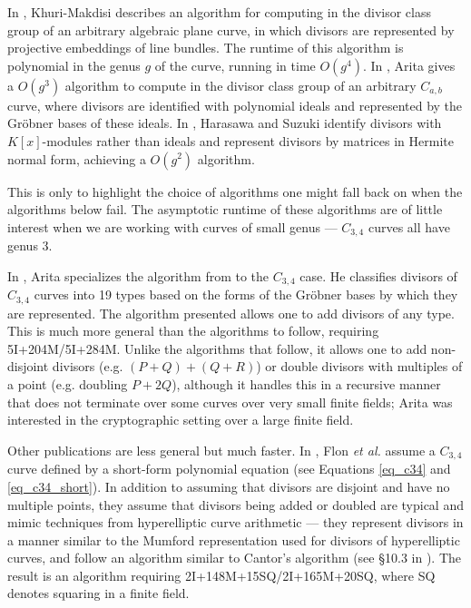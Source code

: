 In \cite{kmakdisi04}, Khuri-Makdisi describes an algorithm for computing in the divisor class group of an arbitrary algebraic plane curve,
in which divisors are represented by projective embeddings of line bundles.
The runtime of this algorithm is polynomial in the genus $g$ of the curve, running in time $O(g^4)$.
In \cite{arita99}, Arita gives a $O(g^3)$ algorithm to compute in the divisor class group of an arbitrary $C_{a,b}$ curve,
where divisors are identified with polynomial ideals and represented by the Gr\"obner bases of these ideals.
In \cite{harasawa00}, Harasawa and Suzuki identify divisors with $K[x]$-modules rather than ideals and represent divisors by matrices in Hermite normal form,
achieving a $O(g^2)$ algorithm.

This is only to highlight the choice of algorithms one might fall back on when the algorithms below fail.
The asymptotic runtime of these algorithms are of little interest when we are working with curves of small genus ---
$C_{3,4}$ curves all have genus 3.

In \cite{arita05-2}, Arita specializes the algorithm from \cite{arita99} to the $C_{3,4}$ case.
He classifies divisors of $C_{3,4}$ curves into 19 types based on the forms of the Gr\"obner bases by which they are represented.
The algorithm presented allows one to add divisors of any type.
This is much more general than the algorithms to follow, requiring 5I+204M/5I+284M.
Unlike the algorithms that follow, it allows one to add non-disjoint divisors (e.g. $(P + Q) + (Q + R)$)
or double divisors with multiples of a point (e.g. doubling $P + 2Q$),
although it handles this in a recursive manner that does not terminate over some curves over very small finite fields;
Arita was interested in the cryptographic setting over a large finite field.

Other publications are less general but much faster.
In \cite{flon08}, Flon \emph{et al.} assume a $C_{3,4}$ curve defined by a short-form polynomial equation
(see Equations \ref{eq_c34} and \ref{eq_c34_short}).
In addition to assuming that divisors are disjoint and have no multiple points, 
they assume that divisors being added or doubled are typical and mimic techniques from hyperelliptic curve arithmetic ---
they represent divisors in a manner similar to the Mumford representation used for divisors of hyperelliptic curves,
and follow an algorithm similar to Cantor's algorithm (see \S 10.3 in \cite{galbraith12}).
The result is an algorithm requiring 2I+148M+15SQ/2I+165M+20SQ, where SQ denotes squaring in a finite field.

